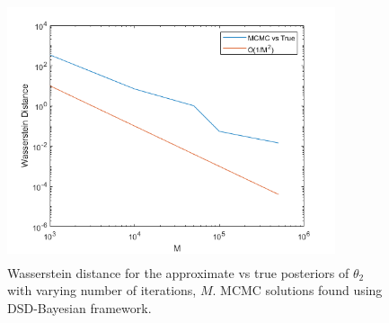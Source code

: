 \documentclass[botnum, fleqn]{unmeethesis}
\begin{document}
\begin{figure}[H]
	\centering
	\includegraphics[width=3.8in,height=3in]{wassDist.png}
	\caption{Wasserstein distance for the approximate vs true posteriors of $\theta_2$ with varying number of iterations, $M$. MCMC solutions found using DSD-Bayesian framework.}
\end{figure}
\end{document}
